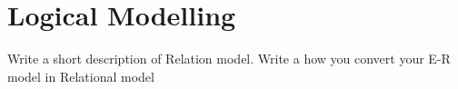 \section{Logical Modelling}\label{sec:lm}
Write a short description of Relation model. 
Write a how you convert your E-R model in Relational model
\clearpage